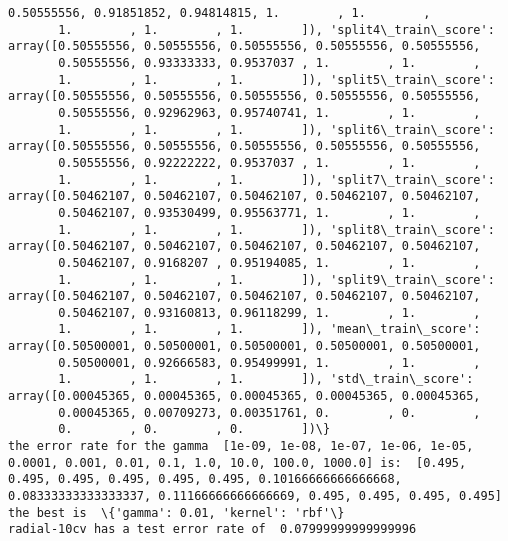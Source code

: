 \documentclass[11pt]{article}
\begin{document}
\begin{Verbatim}[commandchars=\\\{\}]
       0.50555556, 0.91851852, 0.94814815, 1.        , 1.        ,
       1.        , 1.        , 1.        ]), 'split4\_train\_score': array([0.50555556, 0.50555556, 0.50555556, 0.50555556, 0.50555556,
       0.50555556, 0.93333333, 0.9537037 , 1.        , 1.        ,
       1.        , 1.        , 1.        ]), 'split5\_train\_score': array([0.50555556, 0.50555556, 0.50555556, 0.50555556, 0.50555556,
       0.50555556, 0.92962963, 0.95740741, 1.        , 1.        ,
       1.        , 1.        , 1.        ]), 'split6\_train\_score': array([0.50555556, 0.50555556, 0.50555556, 0.50555556, 0.50555556,
       0.50555556, 0.92222222, 0.9537037 , 1.        , 1.        ,
       1.        , 1.        , 1.        ]), 'split7\_train\_score': array([0.50462107, 0.50462107, 0.50462107, 0.50462107, 0.50462107,
       0.50462107, 0.93530499, 0.95563771, 1.        , 1.        ,
       1.        , 1.        , 1.        ]), 'split8\_train\_score': array([0.50462107, 0.50462107, 0.50462107, 0.50462107, 0.50462107,
       0.50462107, 0.9168207 , 0.95194085, 1.        , 1.        ,
       1.        , 1.        , 1.        ]), 'split9\_train\_score': array([0.50462107, 0.50462107, 0.50462107, 0.50462107, 0.50462107,
       0.50462107, 0.93160813, 0.96118299, 1.        , 1.        ,
       1.        , 1.        , 1.        ]), 'mean\_train\_score': array([0.50500001, 0.50500001, 0.50500001, 0.50500001, 0.50500001,
       0.50500001, 0.92666583, 0.95499991, 1.        , 1.        ,
       1.        , 1.        , 1.        ]), 'std\_train\_score': array([0.00045365, 0.00045365, 0.00045365, 0.00045365, 0.00045365,
       0.00045365, 0.00709273, 0.00351761, 0.        , 0.        ,
       0.        , 0.        , 0.        ])\}
the error rate for the gamma  [1e-09, 1e-08, 1e-07, 1e-06, 1e-05, 0.0001, 0.001, 0.01, 0.1, 1.0, 10.0, 100.0, 1000.0] is:  [0.495, 0.495, 0.495, 0.495, 0.495, 0.495, 0.10166666666666668, 0.08333333333333337, 0.11166666666666669, 0.495, 0.495, 0.495, 0.495]
the best is  \{'gamma': 0.01, 'kernel': 'rbf'\}
radial-10cv has a test error rate of  0.07999999999999996

    \end{Verbatim}

    \begin{center}
    \end{center}
    { \hspace*{\fill} \\}
    
\end{document}
